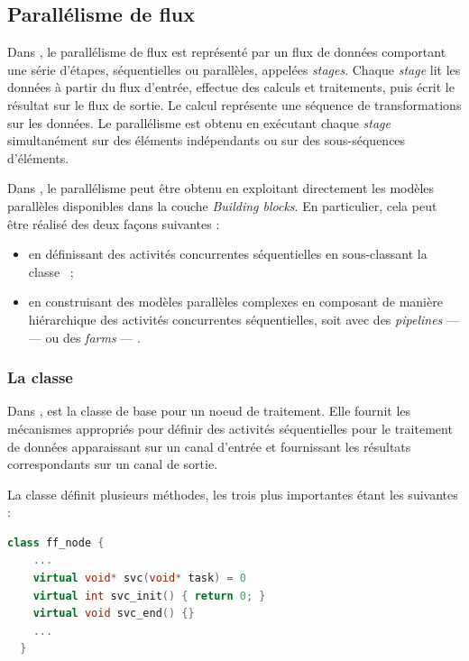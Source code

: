 \subsection{Parall\'elisme de flux}

Dans , le parall\'elisme de flux est repr\'esent\'e par un flux de donn\'ees comportant une s\'erie d'\'etapes, s\'equentielles ou parall\`eles, appel\'ees \emph{stages}. Chaque \emph{stage} lit les donn\'ees \`a partir du flux d'entr\'ee, effectue des calculs et traitements, puis \'ecrit le r\'esultat sur le flux de sortie. Le calcul repr\'esente une s\'equence de transformations sur les donn\'ees. Le parall\'elisme est obtenu en ex\'ecutant chaque \emph{stage} simultan\'ement sur des \'el\'ements ind\'ependants ou sur des sous-s\'equences d'\'el\'ements. 

Dans , le parall\'elisme peut \^etre obtenu en exploitant directement les mod\`eles parall\`eles disponibles dans la couche \emph{Building blocks}. En particulier, cela peut \^etre r\'ealis\'e des deux fa\c{c}ons suivantes :

\begin{itemize}
\item en d\'efinissant des activit\'es concurrentes s\'equentielles en sous-classant la classe ~;
 
\item en construisant des mod\`eles parall\`eles complexes en composant de mani\`ere hi\'erarchique des activit\'es concurrentes s\'equentielles, soit avec des \emph{pipelines} ---  --- ou des \emph{farms} --- .
\end{itemize}

\subsubsection*{La classe }

Dans ,  est la classe de base pour un noeud de traitement. Elle fournit les m\'ecanismes appropri\'es pour d\'efinir des activit\'es s\'equentielles pour le traitement de données apparaissant sur un canal d'entr\'ee et fournissant les r\'esultats correspondants sur un canal de sortie. 

La classe  d\'efinit plusieurs m\'ethodes, les trois plus importantes \'etant les suivantes :
\begin{lstlisting}[language=c++]
  class ff_node {
    ...
    virtual void* svc(void* task) = 0
    virtual int svc_init() { return 0; } 
    virtual void svc_end() {} 
    ...
  }
\end{lstlisting}


